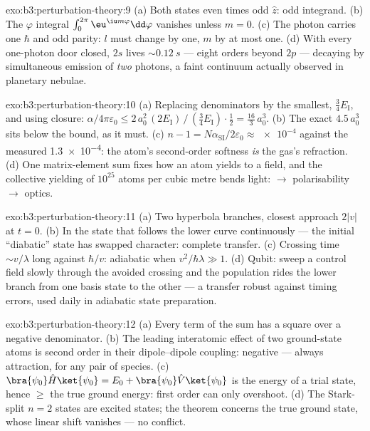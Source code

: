\begin{solution}{exo:b3:perturbation-theory:9}
(a) Both states even times odd $\hat z$: odd integrand. (b) The
$\varphi$ integral $\int_0^{2\pi}\eu^{\iu m\varphi}\dd\varphi$
vanishes unless $m = 0$. (c) The photon carries one $\hbar$ and
odd parity: $l$ must change by one, $m$ by at most one. (d) With
every one-photon door closed, $2s$ lives $\sim\qty{0.12}{s}$ ---
eight orders beyond $2p$ --- decaying by simultaneous emission of
\emph{two} photons, a faint continuum actually observed in
planetary nebulae.
\end{solution}

\begin{solution}{exo:b3:perturbation-theory:10}
(a) Replacing denominators by the smallest, $\tfrac34
E_{\text{I}}$, and using closure: $\alpha/4\pi\varepsilon_0 \le
2\,a_0^2\,(2E_{\text{I}})\,/\,(\tfrac34 E_{\text{I}})\cdot\tfrac12
= \tfrac{16}3\,a_0^3$. (b) The exact $4.5\,a_0^3$ sits below the
bound, as it must. (c) $n - 1 = N\alpha_{\text{SI}}/2\varepsilon_0
\approx \num{e-4}$ against the measured \num{1.3e-4}: the atom's
second-order softness \emph{is} the gas's refraction. (d) One
matrix-element sum fixes how an atom yields to a field, and the
collective yielding of $10^{25}$ atoms per cubic metre bends
light:  $\to$ polarisability $\to$ optics.
\end{solution}

\begin{solution}{exo:b3:perturbation-theory:11}
(a) Two hyperbola branches, closest approach $2|v|$ at $t = 0$.
(b) In the state that follows the lower curve continuously --- the
initial ``diabatic'' state has swapped character: complete
transfer. (c) Crossing time $\sim v/\lambda$ long against
$\hbar/v$: adiabatic when $v^2/\hbar\lambda \gg 1$. (d) Qubit:
sweep a control field slowly through the avoided crossing and the
population rides the lower branch from one basis state to the
other --- a transfer robust against timing errors, used daily in
adiabatic state preparation.
\end{solution}

\begin{solution}{exo:b3:perturbation-theory:12}
(a) Every term of the sum has a square over a negative denominator.
(b) The leading interatomic effect of two ground-state atoms is
second order in their dipole--dipole coupling: negative --- always
attraction, for any pair of species. (c) $\bra{\psi_0}\hat H\ket{
\psi_0} = E_0 + \bra{\psi_0}\hat V\ket{\psi_0}$ is the energy of a
trial state, hence $\ge$ the true ground energy: first order can
only overshoot. (d) The Stark-split $n = 2$ states are excited
states; the theorem concerns the true ground state, whose linear
shift vanishes --- no conflict.
\end{solution}

